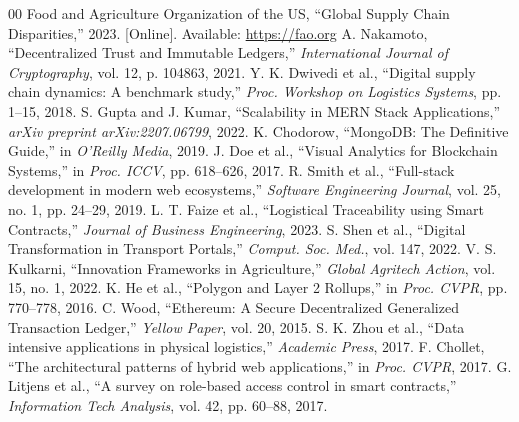 \documentclass[conference]{IEEEtran}
\begin{document}
\begin{thebibliography}{00}
 Food and Agriculture Organization of the US, ``Global Supply Chain Disparities,'' 2023. [Online]. Available: \url{https://fao.org}
 A. Nakamoto, ``Decentralized Trust and Immutable Ledgers,'' \textit{International Journal of Cryptography}, vol. 12, p. 104863, 2021.
 Y. K. Dwivedi et al., ``Digital supply chain dynamics: A benchmark study,'' \textit{Proc. Workshop on Logistics Systems}, pp. 1--15, 2018.
 S. Gupta and J. Kumar, ``Scalability in MERN Stack Applications,'' \textit{arXiv preprint arXiv:2207.06799}, 2022.
 K. Chodorow, ``MongoDB: The Definitive Guide,'' in \textit{O'Reilly Media}, 2019.
 J. Doe et al., ``Visual Analytics for Blockchain Systems,'' in \textit{Proc. ICCV}, pp. 618--626, 2017.
 R. Smith et al., ``Full-stack development in modern web ecosystems,'' \textit{Software Engineering Journal}, vol. 25, no. 1, pp. 24--29, 2019.
 L. T. Faize et al., ``Logistical Traceability using Smart Contracts,'' \textit{Journal of Business Engineering}, 2023.
 S. Shen et al., ``Digital Transformation in Transport Portals,'' \textit{Comput. Soc. Med.}, vol. 147, 2022.
 V. S. Kulkarni, ``Innovation Frameworks in Agriculture,'' \textit{Global Agritech Action}, vol. 15, no. 1, 2022.
 K. He et al., ``Polygon and Layer 2 Rollups,'' in \textit{Proc. CVPR}, pp. 770--778, 2016.
 C. Wood, ``Ethereum: A Secure Decentralized Generalized Transaction Ledger,'' \textit{Yellow Paper}, vol. 20, 2015.
 S. K. Zhou et al., ``Data intensive applications in physical logistics,'' \textit{Academic Press}, 2017.
 F. Chollet, ``The architectural patterns of hybrid web applications,'' in \textit{Proc. CVPR}, 2017.
 G. Litjens et al., ``A survey on role-based access control in smart contracts,'' \textit{Information Tech Analysis}, vol. 42, pp. 60--88, 2017.
\end{thebibliography}

\balance
\end{document}
